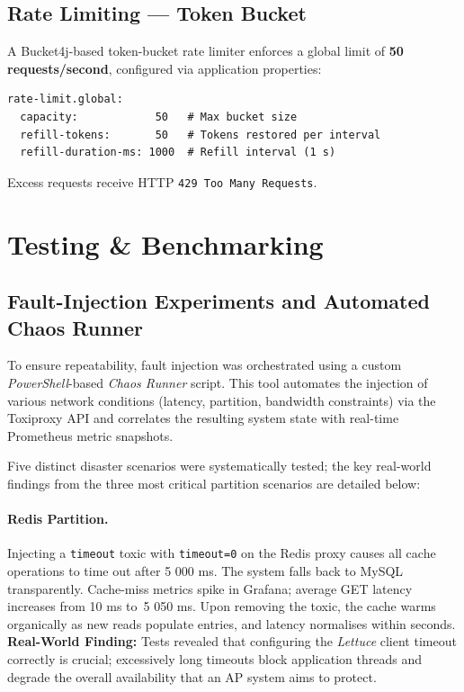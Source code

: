 \documentclass[12pt,a4paper,twoside]{article}
\newcommand{\tech}[1]{\textit{#1}}
\begin{document}
\subsection{Rate Limiting — Token Bucket}

A Bucket4j-based token-bucket rate limiter enforces a global limit of
\textbf{50 requests/second}, configured via application properties:

\begin{lstlisting}[style=yamlStyle, caption={Rate limiter configuration}]
rate-limit.global:
  capacity:            50   # Max bucket size
  refill-tokens:       50   # Tokens restored per interval
  refill-duration-ms: 1000  # Refill interval (1 s)
\end{lstlisting}

Excess requests receive HTTP \texttt{429 Too Many Requests}.

\section{Testing \& Benchmarking}
\label{sec:testing}

\subsection{Fault-Injection Experiments and Automated Chaos Runner}

To ensure repeatability, fault injection was orchestrated using a custom
\tech{PowerShell}-based \emph{Chaos Runner} script. This tool automates the injection
of various network conditions (latency, partition, bandwidth constraints) via the Toxiproxy API
and correlates the resulting system state with real-time Prometheus metric snapshots.

Five distinct disaster scenarios were systematically tested; the key real-world findings
from the three most critical partition scenarios are detailed below:

\paragraph{Redis Partition.}
Injecting a \texttt{timeout} toxic with \texttt{timeout=0} on the
Redis proxy causes all cache operations to time out after 5 000 ms.
The system falls back to MySQL transparently. Cache-miss metrics spike
in Grafana; average GET latency increases from 10 ms to~5 050 ms.
Upon removing the toxic, the cache warms organically as new reads
populate entries, and latency normalises within seconds.
\textbf{Real-World Finding:} Tests revealed that configuring the \tech{Lettuce} client
timeout correctly is crucial; excessively long timeouts block application threads and
degrade the overall availability that an AP system aims to protect.
\end{document}
